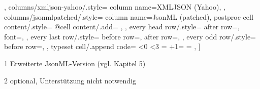 \begin{threeparttable}
{    },
    columns/xmljson-yahoo/.style={
        column name=XMLJSON (Yahoo),
    },
    columns/jsonmlpatched/.style={
        column name={JsonML (patched)},
        postproc cell content/.style={%
            @cell content/.add={
               }{}
        },
    },
    every head row/.style={
        after row=\toprule,
        font=\selectfont,
    },
    every last row/.style={
        before row=\midrule,
        after row=\bottomrule,
    },
    every odd row/.style={
        before row={},
    },
    typeset cell/.append code={%
        \ifnum\pgfplotstablerow<0%
            \ifnum\pgfplotstablecol<3
            \else
                \ifnum\pgfplotstablecol=\pgfplotstablecols
                \else
                \fi
            \fi
        \fi
        \ifnum\numexpr\pgfplotstablerow+1=\pgfplotstablerows
            \ifnum\pgfplotstablecol=\pgfplotstablecols
            \else
            \fi
        \fi
    },
]\loadedtable
    \begin{tablenotes}
        \item[1] Erweiterte JsonML-Version (vgl. Kapitel 5)
        \ifx\hasfootnote\undefined
        \else
    \item[2] optional, Unterst{\"u}tzung nicht notwendig
        \fi
    \end{tablenotes}
  \end{threeparttable}\hspace{2.2em}

